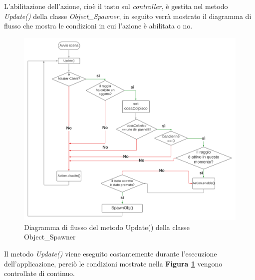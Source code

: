 L'abilitazione dell'azione, cioè il tasto sul \textit{controller}, è gestita nel metodo \textit{Update()} della classe \textit{Object\_Spawner}, in seguito verrà mostrato il diagramma di flusso che mostra le condizioni in cui l'azione è abilitata o no.
\begin{figure}[H]
    \centering
    \includegraphics[scale = 0.45]{Immagini/Diagramma SpawnObj().jpg}
    \caption{Diagramma di flusso del metodo Update() della classe Object\_Spawner}
    \label{fig:4.6}
\end{figure}
\hspace{-0.6cm}Il metodo \textit{Update()} viene eseguito costantemente durante l'esecuzione dell'applicazione, perciò le condizioni mostrate nella \textbf{Figura \ref{fig:4.6}} vengono controllate di continuo.

